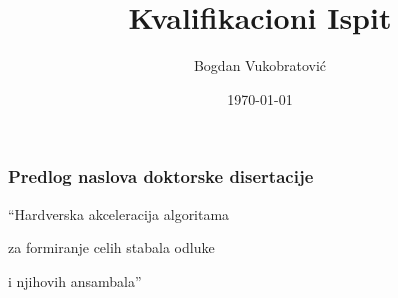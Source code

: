\documentclass{beamer}
\title[Short title]{Kvalifikacioni Ispit} %
\author{Bogdan Vukobratović} %
\institute[FTN] %
{
Fakultet Tehničkih Nauka \\ %
\medskip
\textit{bogdan.vukobratovic@gmail.com} %
}
\date{\today} %
\begin{document}
\begin{frame}
\titlepage %
\end{frame}





\begin{frame}
\frametitle{Predlog naslova doktorske disertacije}
\huge{\centerline{“Hardverska akceleracija algoritama}}
\huge{\centerline{za formiranje celih stabala odluke}}
\huge{\centerline{i njihovih ansambala”}}
\end{frame}

\end{document}
